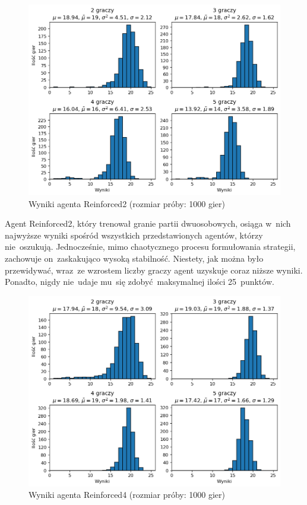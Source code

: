 \documentclass[declaration,shortabstract,inz]{iithesis}
\begin{document}
\begin{figure}[H]
	\centering
	\captionsetup{format=hang}
	\includegraphics[width=\textwidth,height=\textheight,keepaspectratio]{Reinforced2.png}
	\caption[Caption]{Wyniki agenta Reinforced2 (rozmiar próby: 1000 gier)}
	\label{fig:Reinforced2}
\end{figure}

Agent Reinforced2, który trenował granie partii dwuosobowych, osiąga w~nich najwyższe wyniki spośród wszystkich przedstawionych agentów, którzy nie~oszukują. Jednocześnie, mimo chaotycznego procesu formułowania strategii, zachowuje on~zaskakująco wysoką stabilność. Niestety, jak można było przewidywać, wraz~ze wzrostem liczby graczy agent uzyskuje coraz niższe wyniki. Ponadto, nigdy nie~udaje mu~się zdobyć maksymalnej ilości 25~punktów.

\bigskip

\begin{figure}[H]
	\centering
	\captionsetup{format=hang}
	\includegraphics[width=\textwidth,height=\textheight,keepaspectratio]{Reinforced4.png}
	\caption[Caption]{Wyniki agenta Reinforced4 (rozmiar próby: 1000 gier)}
	\label{fig:Reinforced4}
\end{figure}
\end{document}
